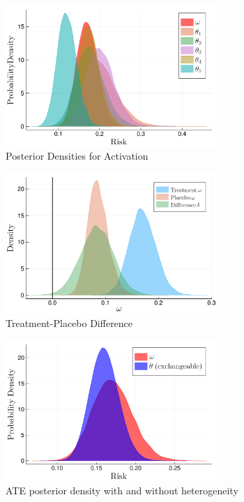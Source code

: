 \documentclass{juliacon}
\begin{document}
{%
\begin{figure}[t]
	\centerline{\includegraphics[width=8cm]{thetas_omega.pdf}}
	\caption{Posterior Densities for Activation}
	\label{fig:activ}
\end{figure}

\begin{figure}[t]
	\centerline{\includegraphics[width=8cm]{treat_pbo_diff2.pdf}}
	\caption{Treatment-Placebo Difference}
	\label{fig:diff}
\end{figure}


\begin{table}
	\label{tab:delta_results}
\end{table}


\begin{figure}[t]
	\centerline{\includegraphics[width=8cm]{bhm_vs_exc.pdf}}
	\caption{ATE posterior density with and without heterogeneity}
	\label{fig:compare}	
\end{figure}
 
}
\end{document}
